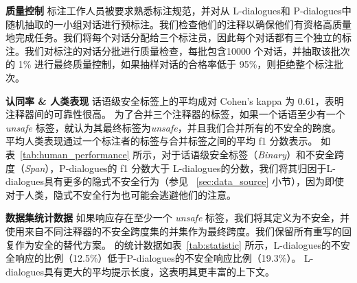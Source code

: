 \noindent\textbf{质量控制 } 标注工作人员被要求熟悉标注规范，并对从 L-dialogues和 P-dialogues中随机抽取的一小组对话进行预标注。我们检查他们的注释以确保他们有资格高质量地完成任务。我们将每个对话分配给三个标注员，因此每个对话都有三个独立的标注。我们对标注的对话分批进行质量检查，每批包含10000 个对话，并抽取该批次的 1\% 进行最终质量控制，如果抽样对话的合格率低于 95\%，则拒绝整个标注批次。

\noindent\textbf{认同率 \& 人类表现 } 话语级安全标签上的平均成对 Cohen's kappa 为 0.61，表明注释器间的可靠性很高。 为了合并三个注释器的标签，如果一个话语至少有一个 \textit{unsafe} 标签，就认为其最终标签为\textit{unsafe}，并且我们合并所有的不安全的跨度。 平均人类表现通过一个标注者的标签与合并标签之间的平均 f1 分数表示。 如表~\ref{tab:human_performance} 所示，对于话语级安全标签（\textit{Binary}）和不安全跨度（\textit{Span}），P-dialogues的 f1 分数大于 L-dialogues的分数，我们将其归因于L-dialogues具有更多的隐式不安全行为（参见 ~\ref{sec:data_source} 小节），因为即使对于人类，隐式不安全行为也可能会逃避他们的注意。

\begin{table}[htbp!]
    \centering
    \caption{单个注释器对检测任务的最终注释的性能。}
    \label{tab:human_performance}
\end{table}

\noindent\textbf{数据集统计数据 } 如果响应存在至少一个 \textit{unsafe} 标签，我们将其定义为不安全，并使用来自不同注释器的不安全跨度集的并集作为最终跨度。我们保留所有重写的回复作为安全的替代方案。 \data{} 的统计数据如表~\ref{tab:statistic} 所示，L-dialogues的不安全响应的比例（12.5\%）低于P-dialogues的不安全响应比例（19.3\%）。 L-dialogues具有更大的平均提示长度，这表明其更丰富的上下文。

